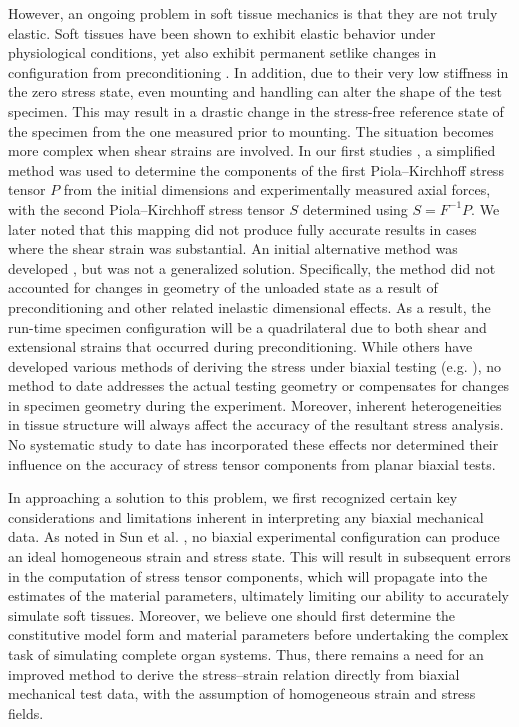     However, an ongoing problem in soft tissue mechanics is that they are not truly elastic. Soft tissues have been shown to exhibit elastic behavior under physiological conditions, yet also exhibit permanent setlike changes in configuration from preconditioning \cite{sacks_biaxial_2000}\cite{sun_biaxial_2003}\cite{stella_time_2007}. In addition, due to their very low stiffness in the zero stress state, even mounting and handling can alter the shape of the test specimen. This may result in a drastic change in the stress-free reference state of the specimen from the one measured prior to mounting. The situation becomes more complex when shear strains are involved. In our first studies \cite{sacks_method_1999}, a simplified method was used to determine the components of the first Piola–Kirchhoff stress tensor $P$ from the initial dimensions and experimentally measured axial forces, with the second Piola–Kirchhoff stress tensor $S$ determined using $S = F^{-1}P$. We later noted that this mapping did not produce fully accurate results in cases where the shear strain was substantial. An initial alternative method was developed \cite{freed_hypoelastic_2010}, but was not a generalized solution. Specifically, the method did not accounted for changes in geometry of the unloaded state as a result of preconditioning and other related inelastic dimensional effects. As a result, the run-time specimen configuration will be a quadrilateral due to both shear and extensional strains that occurred during preconditioning. While others have developed various methods of deriving the stress under biaxial testing (e.g. \cite{fomovsky_evolution_2010}), no method to date addresses the actual testing geometry or compensates for changes in specimen geometry during the experiment. Moreover, inherent heterogeneities in tissue structure will always affect the accuracy of the resultant stress analysis. No systematic study to date has incorporated these effects nor determined their influence on the accuracy of stress tensor components from planar biaxial tests.
    
    
    In approaching a solution to this problem, we first recognized certain key considerations and limitations inherent in interpreting any biaxial mechanical data. As noted in Sun et al. \cite{sun_numerical_2003}, no biaxial experimental configuration can produce an ideal homogeneous strain and stress state. This will result in subsequent errors in the computation of stress tensor components, which will propagate into the estimates of the material parameters, ultimately limiting our ability to accurately simulate soft tissues. Moreover, we believe one should first determine the constitutive model form and material parameters before undertaking the complex task of simulating complete organ systems. Thus, there remains a need for an improved method to derive the stress–strain relation directly from biaxial mechanical test data, with the assumption of homogeneous strain and stress fields.
    
